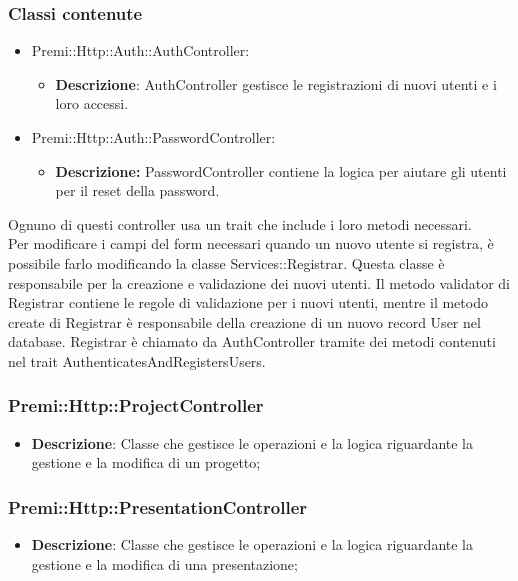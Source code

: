 	\subsubsection*{Classi contenute}
		\begin{itemize}
			\item Premi::Http::Auth::AuthController:
				\begin{itemize}
					\item \textbf{Descrizione}: AuthController gestisce le registrazioni di nuovi utenti e i loro accessi.
				\end{itemize}
			\item Premi::Http::Auth::PasswordController:
				\begin{itemize}
					\item \textbf{Descrizione:} PasswordController contiene la logica per aiutare gli utenti per il reset della password.
				\end{itemize}
		\end{itemize}
	Ognuno di questi controller usa un \gls{trait} che include i loro metodi necessari.\\
	Per modificare i campi del form necessari quando un nuovo utente si registra, è possibile farlo modificando la classe Services::Registrar. Questa classe è responsabile per la creazione e validazione dei nuovi utenti. Il metodo validator di Registrar contiene le regole di validazione per i nuovi utenti, mentre il metodo create di Registrar è responsabile della creazione di un nuovo record User nel database. Registrar è chiamato da AuthController tramite dei metodi contenuti nel \gls{trait} AuthenticatesAndRegistersUsers.
			
	\subsubsection*{Premi::Http::ProjectController}
			\begin{itemize}
				\item \textbf{Descrizione}: Classe che gestisce le operazioni e la logica riguardante la gestione e la modifica di un progetto;
			\end{itemize}
			
   \subsubsection*{Premi::Http::PresentationController}
			\begin{itemize}
				\item \textbf{Descrizione}: Classe che gestisce le operazioni e la logica riguardante la gestione e la modifica di una presentazione;
			\end{itemize}
			
